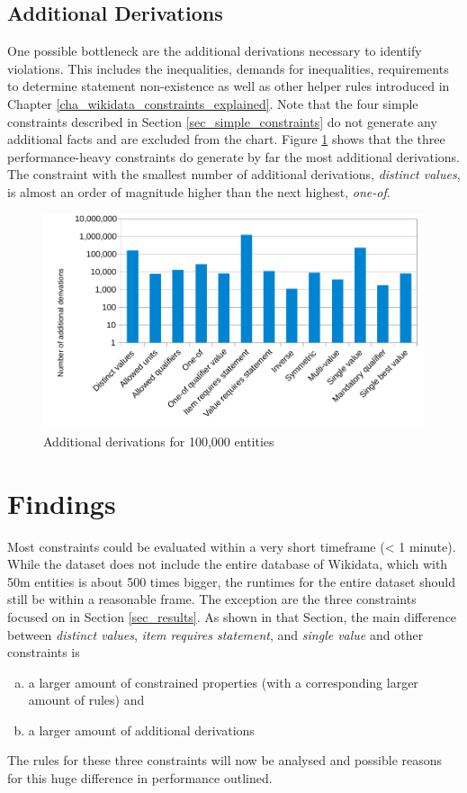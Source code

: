 \documentclass[hyperref,bachelorofscience,fleqn]{cgvpub}
\begin{document}
\subsection{Additional Derivations}
One possible bottleneck are the additional derivations necessary to identify violations. This includes the inequalities, demands for inequalities, requirements to determine statement non-existence as well as other helper rules introduced in Chapter \ref{cha_wikidata_constraints_explained}. Note that the four simple constraints described in Section \ref{sec_simple_constraints} do not generate any additional facts and are excluded from the chart. Figure \ref{fig_add_derivations} shows that the three performance-heavy constraints do generate by far the most additional derivations. The constraint with the smallest number of additional derivations, \emph{distinct values}, is almost an order of magnitude higher than the next highest, \emph{one-of}.

\begin{figure}
\includegraphics[width=\linewidth]{images/additionalDerivations100,000.pdf}
\caption{Additional derivations for 100,000 entities}\label{fig_add_derivations}
\end{figure}

\section{Findings}
Most constraints could be evaluated within a very short timeframe (< 1 minute). While the dataset does not include the entire database of Wikidata, which with 50m entities is about 500 times bigger, the runtimes for the entire dataset should still be within a reasonable frame. The exception are the three constraints focused on in Section \ref{sec_results}. As shown in that Section, the main difference between \emph{distinct values}, \emph{item requires statement}, and \emph{single value} and other constraints is
\begin{enumerate}[a)]
\item a larger amount of constrained properties (with a corresponding larger amount of rules) and
\item a larger amount of additional derivations
\end{enumerate}
The rules for these three constraints will now be analysed and possible reasons for this huge difference in performance outlined.
\end{document}
